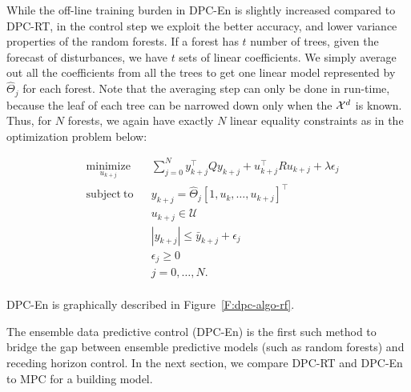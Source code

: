 While the off-line training burden in DPC-En is slightly increased compared to DPC-RT, in the control step we exploit the better accuracy, and lower variance properties of the random forests. 
If a forest has $t$ number of trees, given the forecast of disturbances, we have $t$ sets of linear coefficients. We simply average out all the coefficients from all the trees to get one linear model represented by $\hat{\Theta}_j$ for each forest. Note that the averaging step can only be done in run-time, because the leaf of each tree can be narrowed down only when the $\mathcal{X}^d$ is known. Thus, for $N$ forests, we again have exactly $N$ linear equality constraints as in the optimization problem below:

\begin{problem}\label{P:dpcrf}
	\begin{equation}
	\begin{aligned}
	& \underset{u_{k+j}}{\mathrm{minimize}} & & \sum_{j=0}^{N} y^\top_{k+j} Q y_{k+j} + u^\top_{k+j} R u_{k+j} + \lambda\epsilon_j \\
	& \mathrm{subject\ to }                 & & y_{k+j}      =  \hat{\Theta}_j [1,u_{k},\ldots,u_{k+j} ]^\top                      \\
	&                                       & & u_{k+j}    \in  \mathcal{U}                                                        \\
	&                                       & & |y_{k+j}|  \leq \bar{y}_{k+j} + \epsilon_j 										 \\
	&                                       & & \epsilon_j \geq  0							                                     \\
	&                                       & & j           =    0,\ldots,N.            									         \\
	\end{aligned}
	\label{E:dpcrf}
	\end{equation}
\end{problem}
DPC-En is graphically described in Figure~\ref{F:dpc-algo-rf}.

The ensemble data predictive control (DPC-En) is the first such method to bridge the gap between ensemble predictive models (such as random forests) and receding horizon control. In the next section, we compare DPC-RT and DPC-En to MPC for a building model.

